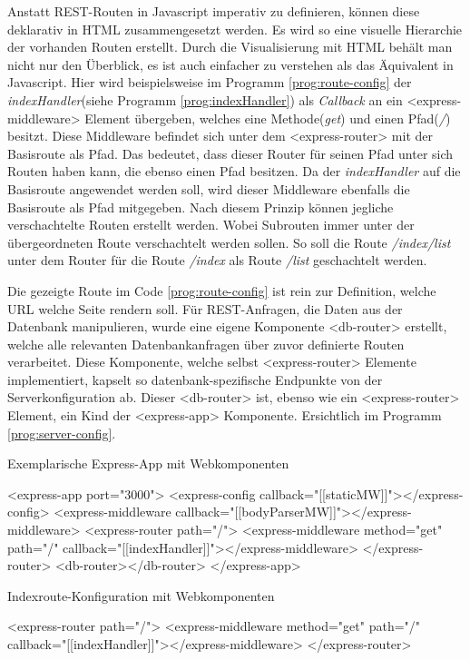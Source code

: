 Anstatt REST-Routen in Javascript imperativ zu definieren, können diese deklarativ in HTML zusammengesetzt werden. Es wird so eine visuelle Hierarchie der vorhanden Routen erstellt. Durch die Visualisierung mit HTML behält man nicht nur den Überblick, es ist auch einfacher zu verstehen als das Äquivalent in Javascript. Hier wird beispielsweise im Programm \ref{prog:route-config} der \textit{indexHandler}(siehe Programm \ref{prog:indexHandler}) als \textit{Callback} an ein <express-middleware> Element übergeben, welches eine Methode(\textit{get}) und einen Pfad(\textit{/})  besitzt. Diese Middleware befindet sich unter dem <express-router> mit der Basisroute als Pfad. Das bedeutet, dass dieser Router für seinen Pfad unter sich Routen haben kann, die ebenso einen Pfad besitzen. Da der \textit{indexHandler} auf die Basisroute angewendet werden soll, wird dieser Middleware ebenfalls die Basisroute als Pfad mitgegeben. Nach diesem Prinzip können jegliche verschachtelte Routen erstellt werden. Wobei Subrouten immer unter der übergeordneten Route verschachtelt werden sollen. So soll die Route \textit{/index/list} unter dem Router für die Route \textit{/index} als Route \textit{/list} geschachtelt werden.

Die gezeigte Route im Code  \ref{prog:route-config} ist rein zur Definition, welche URL welche Seite rendern soll. Für REST-Anfragen, die Daten aus der Datenbank manipulieren, wurde eine eigene Komponente <db-router> erstellt, welche alle relevanten Datenbankanfragen über zuvor definierte Routen verarbeitet. Diese Komponente, welche selbst <express-router> Elemente implementiert, kapselt so datenbank-spezifische Endpunkte von der Serverkonfiguration ab. Dieser <db-router> ist, ebenso wie ein <express-router> Element, ein Kind der <express-app> Komponente. Ersichtlich im Programm \ref{prog:server-config}.

\begin{program}
\caption{Exemplarische Express-App mit Webkomponenten}
\label{prog:server-config}
\begin{HtmlCode}
<express-app port="3000">
	<express-config callback="[[staticMW]]"></express-config>
	<express-middleware callback="[[bodyParserMW]]"></express-middleware>
	<express-router path="/">
	<express-middleware method="get" path="/" callback="[[indexHandler]]"></express-middleware>
	</express-router>
	<db-router></db-router>
</express-app>
\end{HtmlCode}
\end{program}

\begin{program}
\caption{Indexroute-Konfiguration mit Webkomponenten}
\label{prog:route-config}
\begin{HtmlCode}
<express-router path="/">
	<express-middleware method="get" path="/" callback="[[indexHandler]]"></express-middleware>
</express-router>
\end{HtmlCode}
\end{program}

